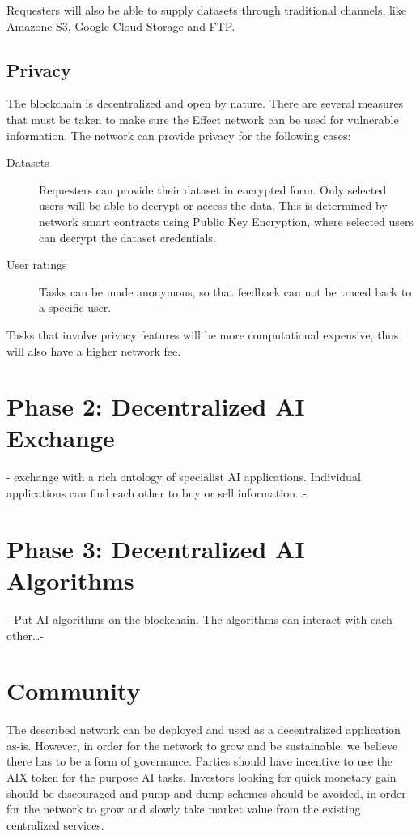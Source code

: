 \documentclass{article}
\begin{document}
Requesters will also be able to supply datasets through traditional
channels, like Amazone S3, Google Cloud Storage and FTP.

\subsection{Privacy}
The blockchain is decentralized and open by nature. There are several
measures that must be taken to make sure the Effect network can be
used for vulnerable information. The network can provide privacy for
the following cases:

\begin{description}
\item[Datasets] Requesters can provide their dataset in encrypted
  form. Only selected users will be able to decrypt or access the
  data. This is determined by network smart contracts using Public Key
  Encryption, where selected users can decrypt the dataset
  credentials.
\item[User ratings] Tasks can be made anonymous, so that feedback can
  not be traced back to a specific user.
\end{description}

Tasks that involve privacy features will be more computational
expensive, thus will also have a higher network fee.

\section{Phase 2: Decentralized AI Exchange}
\label{sec:phase2}
- exchange with a rich ontology of specialist AI applications. Individual applications can find each other to buy or sell information\dots -

\section{Phase 3: Decentralized AI Algorithms}
\label{sec:phase3}
- Put AI algorithms on the blockchain. The algorithms can interact with each other\dots -

\section{Community}
The described network can be deployed and used as a decentralized
application as-is. However, in order for the network to grow and be
sustainable, we believe there has to be a form of governance. Parties
should have incentive to use the AIX token for the purpose AI
tasks. Investors looking for quick monetary gain should be discouraged
and pump-and-dump schemes should be avoided, in order for the network
to grow and slowly take market value from the existing centralized
services.
\end{document}
